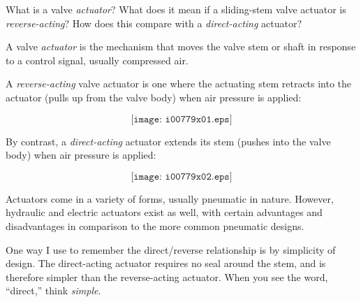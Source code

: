 

What is a valve {\it actuator}?  What does it mean if a sliding-stem valve actuator is {\it reverse-acting}?  How does this compare with a {\it direct-acting} actuator?







A valve {\it actuator} is the mechanism that moves the valve stem or shaft in response to a control signal, usually compressed air.

\vskip 10pt

A {\it reverse-acting} valve actuator is one where the actuating stem retracts into the actuator (pulls up from the valve body) when air pressure is applied:

$$\texttt{[image: i00779x01.eps]}$$

By contrast, a {\it direct-acting} actuator extends its stem (pushes into the valve body) when air pressure is applied:

$$\texttt{[image: i00779x02.eps]}$$







Actuators come in a variety of forms, usually pneumatic in nature.  However, hydraulic and electric actuators exist as well, with certain advantages and disadvantages in comparison to the more common pneumatic designs.

One way I use to remember the direct/reverse relationship is by simplicity of design.  The direct-acting actuator requires no seal around the stem, and is therefore simpler than the reverse-acting actuator.  When you see the word, ``direct,'' think {\it simple}.




